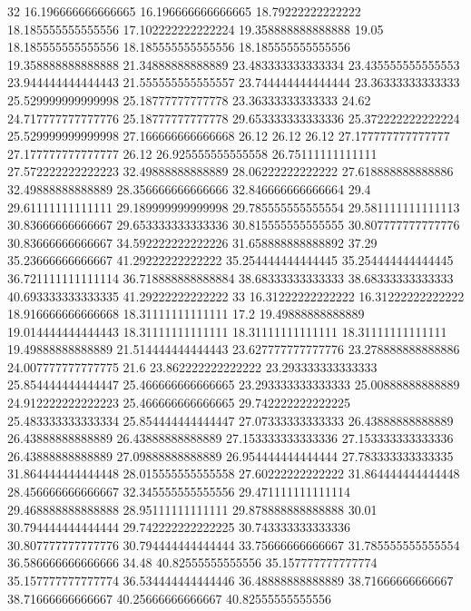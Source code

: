 32 16.196666666666665 16.196666666666665 18.79222222222222 18.185555555555556 17.102222222222224 19.358888888888888 19.05 18.185555555555556 18.185555555555556 18.185555555555556 19.358888888888888 21.34888888888889 23.483333333333334 23.435555555555553 23.944444444444443 21.555555555555557 23.744444444444444 23.36333333333333 25.529999999999998 25.18777777777778 23.36333333333333 24.62 24.717777777777776 25.18777777777778 29.653333333333336 25.372222222222224 25.529999999999998 27.166666666666668 26.12 26.12 26.12 27.177777777777777 27.177777777777777 26.12 26.925555555555558 26.75111111111111 27.572222222222223 32.49888888888889 28.06222222222222 27.618888888888886 32.49888888888889 28.356666666666666 32.846666666666664 29.4 29.61111111111111 29.189999999999998 29.785555555555554 29.581111111111113 30.83666666666667 29.653333333333336 30.815555555555555 30.807777777777776 30.83666666666667 34.592222222222226 31.658888888888892 37.29 35.23666666666667 41.29222222222222 35.254444444444445 35.254444444444445 36.721111111111114 36.718888888888884 38.68333333333333 38.68333333333333 40.693333333333335 41.29222222222222
33 16.31222222222222 16.31222222222222 18.916666666666668 18.31111111111111 17.2 19.49888888888889 19.014444444444443 18.31111111111111 18.31111111111111 18.31111111111111 19.49888888888889 21.514444444444443 23.627777777777776 23.278888888888886 24.007777777777775 21.6 23.862222222222222 23.293333333333333 25.854444444444447 25.466666666666665 23.293333333333333 25.00888888888889 24.912222222222223 25.466666666666665 29.742222222222225 25.483333333333334 25.854444444444447 27.07333333333333 26.43888888888889 26.43888888888889 26.43888888888889 27.153333333333336 27.153333333333336 26.43888888888889 27.09888888888889 26.954444444444444 27.783333333333335 31.864444444444448 28.015555555555558 27.60222222222222 31.864444444444448 28.456666666666667 32.345555555555556 29.471111111111114 29.468888888888888 28.95111111111111 29.878888888888888 30.01 30.794444444444444 29.742222222222225 30.743333333333336 30.807777777777776 30.794444444444444 33.75666666666667 31.785555555555554 36.586666666666666 34.48 40.82555555555556 35.157777777777774 35.157777777777774 36.534444444444446 36.48888888888889 38.71666666666667 38.71666666666667 40.25666666666667 40.82555555555556
